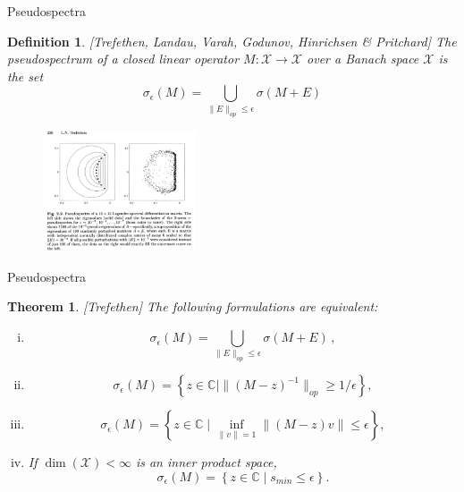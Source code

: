 \documentclass[
  english,            %
  aspectratio=169,    %
]{tumbeamer}
\newtheorem{theorem}{Theorem}
\newtheorem{definition}{Definition}
\newcommand{\bbC}{{\mathbb C}}
\newcommand{\cX}{\mathcal{X}}
\begin{document}
\begin{frame}{Pseudospectra}

\begin{definition}

  [Trefethen, Landau, Varah, Godunov, Hinrichsen \& Pritchard]
  The pseudospectrum of a closed linear operator $M : \cX \to \cX$ over a Banach space $\cX$ is the set 
  \begin{equation}
    \sigma_\epsilon (M) = \bigcup_{\| E \|_{op} \leq \epsilon} \sigma (M + E)
  \end{equation}
\end{definition}

\begin{figure}
  \centering
  \includegraphics[width=0.4\textwidth]{random_perturbations_of_matrix.jpeg}
\end{figure}

\end{frame}

\begin{frame}{Pseudospectra}
  
\begin{theorem}

  [Trefethen] The following formulations are equivalent:
  \begin{enumerate}[(i)]
    \item \begin{equation}
      \sigma_\epsilon (M) = \bigcup_{\| E \|_{op} \leq \epsilon} \sigma (M + E) \,,
    \end{equation}
    \item \begin{equation}
      \sigma_\epsilon (M) = \left\{ z \in \bbC \mid \| (M - z)^{-1} \|_{op} \geq 1/\epsilon \right\} ,
    \end{equation}
    \item \begin{equation}
      \sigma_\epsilon (M) = \left\{ z \in \bbC \mid \inf_{\| v \| = 1} \| (M - z) v \| \leq \epsilon \right\} ,
    \end{equation}
    \item If $\dim (\cX) < \infty$ is an inner product space, \begin{equation}
      \sigma_\epsilon (M) = \left\{ z \in \bbC \mid s_{min} \leq \epsilon \right\} .
    \end{equation}
  \end{enumerate}
\end{theorem}

\end{frame}
\end{document}
